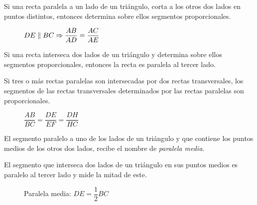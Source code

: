 
\begin{theorem}
    Si una recta paralela a un lado de un triángulo, corta a los otros dos lados en puntos distintos, entonces determina sobre ellos segmentos proporcionales.
    
    \begin{figure}[!h]
        \centering
        
        \caption{$DE \parallel BC \Rightarrow \dfrac{AB}{AD} = \dfrac{AC}{AE}$}
        \label{fig:theorem21}
    \end{figure}
\end{theorem}

\begin{theorem}
    Si una recta interseca dos lados de un triángulo y determina sobre ellos segmentos proporcionales, entonces la recta es paralela al tercer lado.    
\end{theorem}

\begin{theorem}
    Si tres o más rectas paralelas son intersecadas por dos rectas transversales, los segmentos de las rectas transversales determinados por las rectas paralelas son proporcionales.

    \begin{figure}[!h]
        \centering
        
        \caption{$\dfrac{AB}{BC} = \dfrac{DE}{EF} = \dfrac{DH}{HC}$}
        \label{fig:theorem22}
    \end{figure}    
\end{theorem}

\clearpage

\begin{definition}
    El segmento paralelo a uno de los lados de un triángulo y que contiene los puntos medios de los otros dos lados, recibe el nombre de \textit{paralela media}.
\end{definition}

\begin{theorem}
    El segmento que interseca dos lados de un triángulo en sus puntos medios es paralelo al tercer lado y mide la mitad de este.
\end{theorem}

\begin{figure}[!h]
    \centering
    
    \caption{Paralela media: $DE = \dfrac{1}{2}BC$}
    \label{fig:paralela-media}
\end{figure}    

